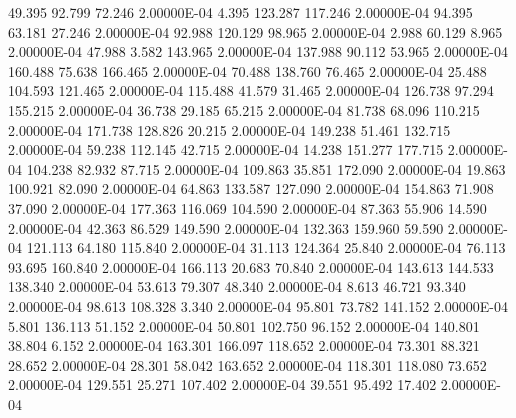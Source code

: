     49.395    92.799    72.246  2.00000E-04
     4.395   123.287   117.246  2.00000E-04
    94.395    63.181    27.246  2.00000E-04
    92.988   120.129    98.965  2.00000E-04
     2.988    60.129     8.965  2.00000E-04
    47.988     3.582   143.965  2.00000E-04
   137.988    90.112    53.965  2.00000E-04
   160.488    75.638   166.465  2.00000E-04
    70.488   138.760    76.465  2.00000E-04
    25.488   104.593   121.465  2.00000E-04
   115.488    41.579    31.465  2.00000E-04
   126.738    97.294   155.215  2.00000E-04
    36.738    29.185    65.215  2.00000E-04
    81.738    68.096   110.215  2.00000E-04
   171.738   128.826    20.215  2.00000E-04
   149.238    51.461   132.715  2.00000E-04
    59.238   112.145    42.715  2.00000E-04
    14.238   151.277   177.715  2.00000E-04
   104.238    82.932    87.715  2.00000E-04
   109.863    35.851   172.090  2.00000E-04
    19.863   100.921    82.090  2.00000E-04
    64.863   133.587   127.090  2.00000E-04
   154.863    71.908    37.090  2.00000E-04
   177.363   116.069   104.590  2.00000E-04
    87.363    55.906    14.590  2.00000E-04
    42.363    86.529   149.590  2.00000E-04
   132.363   159.960    59.590  2.00000E-04
   121.113    64.180   115.840  2.00000E-04
    31.113   124.364    25.840  2.00000E-04
    76.113    93.695   160.840  2.00000E-04
   166.113    20.683    70.840  2.00000E-04
   143.613   144.533   138.340  2.00000E-04
    53.613    79.307    48.340  2.00000E-04
     8.613    46.721    93.340  2.00000E-04
    98.613   108.328     3.340  2.00000E-04
    95.801    73.782   141.152  2.00000E-04
     5.801   136.113    51.152  2.00000E-04
    50.801   102.750    96.152  2.00000E-04
   140.801    38.804     6.152  2.00000E-04
   163.301   166.097   118.652  2.00000E-04
    73.301    88.321    28.652  2.00000E-04
    28.301    58.042   163.652  2.00000E-04
   118.301   118.080    73.652  2.00000E-04
   129.551    25.271   107.402  2.00000E-04
    39.551    95.492    17.402  2.00000E-04